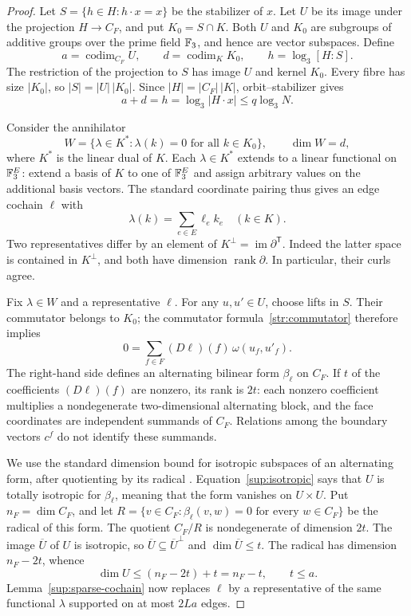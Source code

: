 \begin{proof}
Let $S=\{h\in H:h\cdot x=x\}$ be the stabilizer of $x$. Let $U$ be
its image under the projection $H\to C_F$, and put $K_0=S\cap K$.
Both $U$ and $K_0$ are subgroups of additive groups over the prime field
$\mathbb F_3$, and hence are vector subspaces. Define
\[
 a=\operatorname{codim}_{C_F}U,\qquad
 d=\operatorname{codim}_{K}K_0,\qquad
 h=\log_3[H:S].
\]
The restriction of the projection to $S$ has image $U$ and kernel $K_0$.
Every fibre has size $|K_0|$, so $|S|=|U|\,|K_0|$. Since
$|H|=|C_F|\,|K|$, orbit--stabilizer gives
\begin{equation}\label{sup:index}
 a+d=h=\log_3|H\cdot x|\le q\log_3N.
\end{equation}

Consider the annihilator
\[
 W=\{\lambda\in K^*: \lambda(k)=0\text{ for all }k\in K_0\},
 \qquad \dim W=d,
\]
where $K^*$ is the linear dual of $K$. Each $\lambda\in K^*$ extends
to a linear functional on $\mathbb F_3^E$: extend a basis of $K$ to one of
$\mathbb F_3^E$ and assign arbitrary values on the additional basis vectors.
The standard coordinate pairing thus gives an edge cochain $\ell$ with
\[
 \lambda(k)=\sum_{e\in E}\ell_e k_e\quad(k\in K).
\]
Two representatives differ by an element of
$K^\perp=\operatorname{im}\partial^{\mathsf T}$. Indeed the latter
space is contained in $K^\perp$, and both have dimension
$\operatorname{rank}\partial$. In particular, their curls agree.

Fix $\lambda\in W$ and a representative $\ell$. For any $u,u'\in U$,
choose lifts in $S$. Their commutator belongs to $K_0$; the commutator
formula~\eqref{str:commutator} therefore implies
\begin{equation}\label{sup:isotropic}
 0=\sum_{f\in F}(D\ell)(f)\,\omega(u_f,u'_f).
\end{equation}
The right-hand side defines an alternating bilinear form $\beta_\ell$
on $C_F$. If $t$ of the coefficients $(D\ell)(f)$ are nonzero, its
rank is $2t$: each nonzero coefficient multiplies a nondegenerate
two-dimensional alternating block, and the face coordinates are
independent summands of $C_F$. Relations among the boundary vectors
$c^f$ do not identify these summands.

We use the standard dimension bound for isotropic subspaces of an
alternating form, after quotienting by its radical
\cite[Sections~3.1 and~3.3]{cameron2000classical}.
Equation~\eqref{sup:isotropic} says that $U$ is totally isotropic for
$\beta_\ell$, meaning that the form vanishes on $U\times U$. Put
$n_F=\dim C_F$, and let
$R=\{v\in C_F:\beta_\ell(v,w)=0\text{ for every }w\in C_F\}$
be the radical of this form. The quotient $C_F/R$ is nondegenerate of
dimension $2t$. The image $\overline U$ of $U$
is isotropic, so $\overline U\subseteq\overline U^{\perp}$ and
$\dim\overline U\le t$. The radical has dimension $n_F-2t$, whence
\[
 \dim U\le(n_F-2t)+t=n_F-t,
 \qquad t\le a.
\]
Lemma~\ref{sup:sparse-cochain} now replaces $\ell$ by a representative
of the same functional $\lambda$ supported on at most $2La$ edges.


\end{proof}
